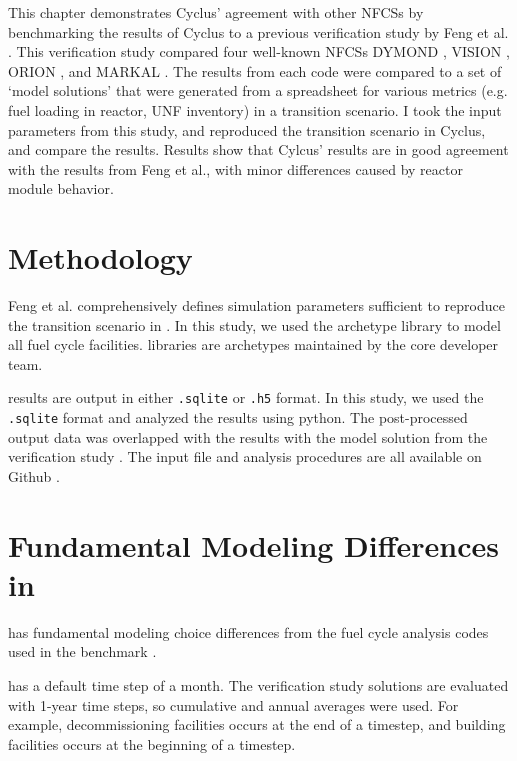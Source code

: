 This chapter demonstrates Cyclus' agreement with other
\glspl{NFCS} by benchmarking the results of Cyclus to
a previous verification study by Feng et al. \cite{feng_standardized_2016}.
This verification study compared four well-known \glspl{NFCS}
DYMOND \cite{yacout_modeling_2005},
VISION \cite{jacobson_verifiable_2010},
ORION \cite{gregg_analysis_2012}, and
MARKAL \cite{shay_epa_2006}. The results from each code were compared to a
set of `model solutions' that were generated from a spreadsheet
for various metrics (e.g. fuel loading in reactor, \gls{UNF} inventory)
in a transition scenario. I took the input parameters from this study,
and reproduced the transition scenario in Cyclus, and compare the results.
Results show that Cylcus' results are in good agreement with the results
from Feng et al., with minor differences caused by reactor module behavior.

\section{Methodology}

Feng et al. comprehensively defines simulation parameters
sufficient to reproduce the transition scenario in \Cyclus.
In this study, we used the \Cycamore \cite{huff_fundamental_2016}
archetype library to model
all fuel cycle facilities. \Cycamore libraries are
archetypes maintained by the core developer team.

\Cyclus results are output in either \texttt{.sqlite} or
\texttt{.h5} format. In this study, we used the
\texttt{.sqlite} format and analyzed the results
using python. The post-processed
output data was overlapped with the results with the
model solution from the verification study \cite{feng_standardized_2016}.
The input file and analysis procedures are all available on Github \cite{bae_arfc/transition-scenarios:_2018}.


\section{Fundamental Modeling Differences in \Cyclus}

\Cyclus has fundamental modeling choice differences from the fuel cycle analysis codes
used in the benchmark \cite{feng_standardized_2016}.

\Cyclus has a default time step of a month.
The verification study solutions are evaluated with 1-year time steps, so cumulative and annual averages
were used.
For example, decommissioning
facilities occurs at the end of a timestep, and building facilities
occurs at the beginning of a timestep.

